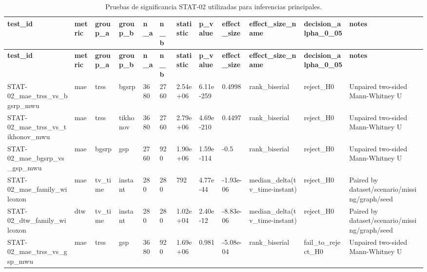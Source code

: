 \begin{landscape}
\scriptsize
\begin{longtable}{p{}p{}p{}p{}p{}p{}p{}p{}p{}p{}p{}p{}}
\caption{Pruebas de significancia STAT-02 utilizadas para inferencias principales.}\label{tab:app_stat02}\\
\toprule
\textbf{test\_id} & \textbf{metric} & \textbf{group\_a} & \textbf{group\_b} & \textbf{n\_a} & \textbf{n\_b} & \textbf{statistic} & \textbf{p\_value} & \textbf{effect\_size} & \textbf{effect\_size\_name} & \textbf{decision\_alpha\_0\_05} & \textbf{notes} \\
\midrule
\endfirsthead
\toprule
\textbf{test\_id} & \textbf{metric} & \textbf{group\_a} & \textbf{group\_b} & \textbf{n\_a} & \textbf{n\_b} & \textbf{statistic} & \textbf{p\_value} & \textbf{effect\_size} & \textbf{effect\_size\_name} & \textbf{decision\_alpha\_0\_05} & \textbf{notes} \\
\midrule
\endhead
STAT-02\_mae\_trss\_vs\_bgsrp\_mwu & mae & trss & bgsrp & 3680 & 2760 & 2.54e+06 & 6.11e-259 & 0.4998 & rank\_biserial & reject\_H0 & Unpaired two-sided Mann-Whitney U \\
STAT-02\_mae\_trss\_vs\_tikhonov\_mwu & mae & trss & tikhonov & 3680 & 2760 & 2.79e+06 & 4.69e-210 & 0.4497 & rank\_biserial & reject\_H0 & Unpaired two-sided Mann-Whitney U \\
STAT-02\_mae\_bgsrp\_vs\_gsp\_mwu & mae & bgsrp & gsp & 2760 & 920 & 1.90e+06 & 1.59e-114 & -0.5 & rank\_biserial & reject\_H0 & Unpaired two-sided Mann-Whitney U \\
STAT-02\_mae\_family\_wilcoxon & mae & tv\_time & instant & 280 & 280 & 792 & 4.77e-44 & -1.93e-06 & median\_delta(tv\_time-instant) & reject\_H0 & Paired by dataset/scenario/missing/graph/seed \\
STAT-02\_dtw\_family\_wilcoxon & dtw & tv\_time & instant & 280 & 280 & 1.02e+04 & 2.40e-12 & -8.83e-06 & median\_delta(tv\_time-instant) & reject\_H0 & Paired by dataset/scenario/missing/graph/seed \\
STAT-02\_mae\_trss\_vs\_gsp\_mwu & mae & trss & gsp & 3680 & 920 & 1.69e+06 & 0.981 & -5.08e-04 & rank\_biserial & fail\_to\_reject\_H0 & Unpaired two-sided Mann-Whitney U \\
\bottomrule
\end{longtable}
\normalsize
\end{landscape}

